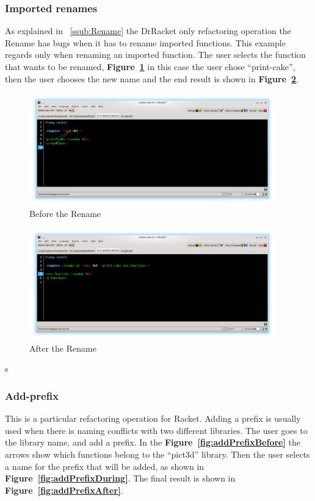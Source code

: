 \subsubsection{Imported renames}
As explained in ~\ref{ssub:Rename} the DrRacket only refactoring operation the Rename has bugs when it has to rename imported functions.
This example regards only when renaming an imported function. The user selects the function that wants to be renamed, {\bf Figure~\ref{fig:renameBefore}} in this case the user chose ``print-cake'', then the user chooses the new name and the end result is shown in {\bf Figure~\ref{fig:renameAfter}}.
\begin{figure}[htbp]
	\centering
	\includegraphics[width=0.95\textwidth]{img/rename1.png}
	\caption{Before the Rename}
	\label{fig:renameBefore}
\end{figure}

\begin{figure}[htbp]
	\centering
	\includegraphics[width=0.95\textwidth]{img/rename2.png}
	\caption{After the Rename}
	\label{fig:renameAfter}
\end{figure}s

\subsubsection{Add-prefix}

This is a particular refactoring operation for Racket. Adding a prefix is usually used when there is naming conflicts with two different libraries. The user goes to the library name, and add a prefix.
In the {\bf Figure~\ref{fig:addPrefixBefore}} the arrows show which functions belong to the ``pict3d'' library.
Then the user selects a name for the prefix that will be added, as shown in {\bf Figure~\ref{fig:addPrefixDuring}}. The final result is shown in {\bf Figure~\ref{fig:addPrefixAfter}}.

